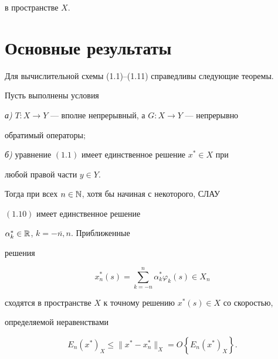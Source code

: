 в пространстве $X$.





\section{Основные результаты}





Для вычислительной схемы (1.1)--(1.11) справедливы следующие теоремы.





\begin{thm}


Пусть выполнены условия


{\em а)} $T:X \to Y$ --- вполне непрерывный, а $G:X \to Y$ --- непрерывно


обратимый операторы$;$


{\em б)} уравнение $(1.1)$ имеет единственное решение $x^* \in X$ при


любой правой части $y \in Y$.





Тогда при всех $n \in \Bbb N$, хотя бы начиная с некоторого, СЛАУ


$(1.10)$ имеет единственное решение


$\alpha_k^* \in \Bbb R$, $k=\overline{-n,n}$. Приближенные


решения


\begin{equation}


x^{*}_{n}(s)=\sum_{k=-n}^{n}\alpha^{*}_{k}\varphi_{k}(s) \in X_n


\tag{$1.8^*$}


\end{equation}


сходятся в пространстве $X$ к точному решению $x^* (s) \in X $ со скоростью,


определяемой неравенствами


\begin{equation}


E_{n}(x^*)_{X} \le \|x^* -x^{*}_{n}\|_X=O\left\{E_{n}(x^*)_X \right\}.


\end{equation}


\end{thm}





